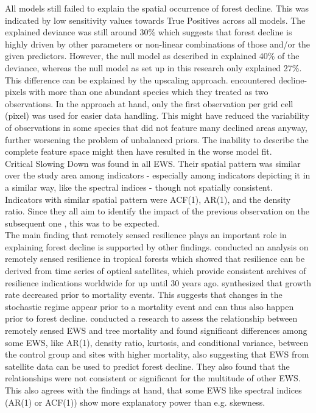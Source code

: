 All models still failed to explain the spatial occurrence of forest decline. This was indicated by low sensitivity values towards True Positives across all models. The explained deviance was still around 30\% which suggests that forest decline is highly driven by other parameters or non-linear combinations of those and/or the given predictors. However, the null model as described in \cite{chaparro2017} explained 40\% of the deviance, whereas the null model as set up in this research only explained 27\%. This difference can be explained by the upscaling approach. \cite{chaparro2017} encountered decline-pixels with more than one abundant species which they treated as two observations. In the approach at hand, only the first observation per grid cell (pixel) was used for easier data handling. This might have reduced the variability of observations in some species that did not feature many declined areas anyway, further worsening the problem of unbalanced priors. The inability to describe the complete feature space might then have resulted in the worse model fit.\\
Critical Slowing Down was found in all EWS. Their spatial pattern was similar over the study area among indicators - especially among indicators depicting it in a similar way, like the spectral indices - though not spatially consistent. Indicators with similar spatial pattern were ACF(1), AR(1), and the density ratio. Since they all aim to identify the impact of the previous observation on the subsequent one \citep{dakos2012}, this was to be expected.\\
The main finding that remotely sensed resilience plays an important role in explaining forest decline is supported by other findings. \cite{verbesselt2016} conducted an analysis on remotely sensed resilience in tropical forests which showed that resilience can be derived from time series of optical satellites, which provide consistent archives of resilience indications worldwide for up until 30 years ago. \cite{cailleret2017} synthesized that growth rate decreased prior to mortality events. This suggests that changes in the stochastic regime appear prior to a mortality event and can thus also happen prior to forest decline. \cite{rogers2018} conducted a research to assess the relationship between remotely sensed EWS and tree mortality and found significant differences among some EWS, like AR(1), density ratio, kurtosis, and conditional variance, between the control group and sites with higher mortality, also suggesting that EWS from satellite data can be used to predict forest decline. They also found that the relationships were not consistent or significant for the multitude of other EWS. This also agrees with the findings at hand, that some EWS like spectral indices (AR(1) or ACF(1)) show more explanatory power than e.g. skewness. \\


